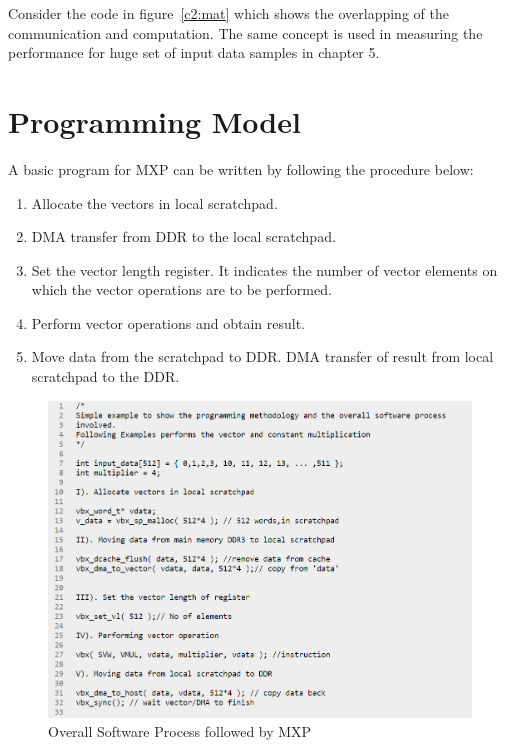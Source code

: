 Consider the code in figure~\ref{c2:mat} which shows the overlapping of the communication and computation.
The same concept is used in measuring the performance for huge set of input data samples in chapter 5.


\section{Programming Model}
A basic program for MXP can be written by following the procedure below:

\begin{enumerate}

	\item Allocate the vectors in local scratchpad.

	\item DMA transfer from DDR to the local scratchpad.

	\item Set the vector length register. It indicates the number of vector elements on which the vector operations are to be performed.

	\item Perform vector operations and obtain result.

	\item Move data from the scratchpad to DDR. DMA transfer of result from local scratchpad to the DDR.

\end{enumerate}

\begin{figure}
	\centering
	\includegraphics[width=.9\textwidth]{images/MXPProcess.png}
	\caption{Overall Software Process followed by MXP}
	\label{c3:mat}
\end{figure}



